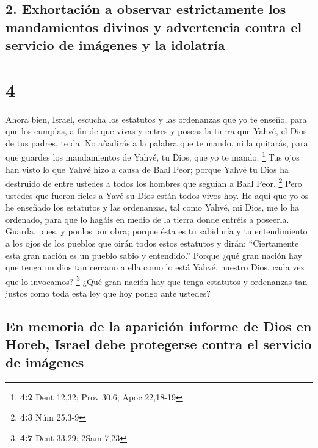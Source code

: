 \begin{paracol}{2}
\hypertarget{exhortaciuxf3n-a-observar-estrictamente-los-mandamientos-divinos-y-advertencia-contra-el-servicio-de-imuxe1genes-y-la-idolatruxeda}{%
\subsection{2. Exhortación a observar estrictamente los mandamientos
divinos y advertencia contra el servicio de imágenes y la
idolatría}\label{exhortaciuxf3n-a-observar-estrictamente-los-mandamientos-divinos-y-advertencia-contra-el-servicio-de-imuxe1genes-y-la-idolatruxeda}}

\hypertarget{section-6}{%
\section{4}\label{section-6}}

 Ahora bien, Israel, escucha los estatutos y las
ordenanzas que yo te enseño, para que los cumplas, a fin de que vivas y
entres y poseas la tierra que Yahvé, el Dios de tus padres, te da.
 No añadirás a la palabra que te mando, ni la quitarás,
para que guardes los mandamientos de Yahvé, tu Dios, que yo te mando.
\footnote{\textbf{4:2} Deut 12,32; Prov 30,6; Apoc 22,18-19}
 Tus ojos han visto lo que Yahvé hizo a causa de Baal
Peor; porque Yahvé tu Dios ha destruido de entre ustedes a todos los
hombres que seguían a Baal Peor. \footnote{\textbf{4:3} Núm 25,3-9}
 Pero ustedes que fueron fieles a Yavé su Dios están todos
vivos hoy.  He aquí que yo os he enseñado los estatutos y
las ordenanzas, tal como Yahvé, mi Dios, me lo ha ordenado, para que lo
hagáis en medio de la tierra donde entréis a poseerla. 
Guarda, pues, y ponlos por obra; porque ésta es tu sabiduría y tu
entendimiento a los ojos de los pueblos que oirán todos estos estatutos
y dirán: ``Ciertamente esta gran nación es un pueblo sabio y
entendido.''  Porque ¿qué gran nación hay que tenga un
dios tan cercano a ella como lo está Yahvé, nuestro Dios, cada vez que
lo invocamos? \footnote{\textbf{4:7} Deut 33,29; 2Sam 7,23}
 ¿Qué gran nación hay que tenga estatutos y ordenanzas tan
justos como toda esta ley que hoy pongo ante ustedes?

\hypertarget{en-memoria-de-la-apariciuxf3n-informe-de-dios-en-horeb-israel-debe-protegerse-contra-el-servicio-de-imuxe1genes}{%
\subsection{En memoria de la aparición informe de Dios en Horeb, Israel
debe protegerse contra el servicio de
imágenes}\label{en-memoria-de-la-apariciuxf3n-informe-de-dios-en-horeb-israel-debe-protegerse-contra-el-servicio-de-imuxe1genes}}


\end{paracol}
